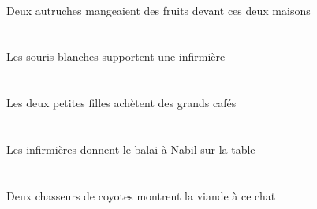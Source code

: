 \begin{exe}
\DEMDuOblG{}   \maisonDDuOblG{}   \DEVANTG{}   \INDDuErgG{}   \autrucheDDuErgG{}   \INDPlAbsG{}   \fruitBPlAbsG{}  \mangerVtPstBPlG{}\\
Deux autruches mangeaient des fruits devant ces deux maisons
\ex\glll
\DEFPlErg{}   \blancAPl{}   \sourisAPlErg{}   \INDSgAbs{}   \infirmiereBSgAbs{}  \supporterVtPrsBSg{}\\
\DEFPlErgP{}   \blancAPlP{}   \sourisAPlErgP{}   \INDSgAbsP{}   \infirmiereBSgAbsP{}  \supporterVtPrsBSgP{}\\
\DEFPlErgG{}   \blancAPlG{}   \sourisAPlErgG{}   \INDSgAbsG{}   \infirmiereBSgAbsG{}  \supporterVtPrsBSgG{}\\
Les souris blanches supportent une infirmière
\ex\glll
\DEFDuErg{}   \petitCDu{}   \filleCDuErg{}   \INDPlAbs{}   \grandDPl{}   \cafeDPlAbs{}  \acheterVtPrsDPl{}\\
\DEFDuErgP{}   \petitCDuP{}   \filleCDuErgP{}   \INDPlAbsP{}   \grandDPlP{}   \cafeDPlAbsP{}  \acheterVtPrsDPlP{}\\
\DEFDuErgG{}   \petitCDuG{}   \filleCDuErgG{}   \INDPlAbsG{}   \grandDPlG{}   \cafeDPlAbsG{}  \acheterVtPrsDPlG{}\\
Les deux petites filles achètent des grands cafés
\ex\glll
\DEFSgObl{}   \tableCSgObl{}   \SUR{}   \DEFPlErg{}   \infirmiereBPlErg{}    \INDSgDat{}   \NabilBSgDat{}   \DEFSgAbs{}   \balaiCSgAbs{}  \donnerVdPrsCSg{}\\
\DEFSgOblP{}   \tableCSgOblP{}   \SURP{}   \DEFPlErgP{}   \infirmiereBPlErgP{}    \INDSgDatP{}   \NabilBSgDatP{}   \DEFSgAbsP{}   \balaiCSgAbsP{}  \donnerVdPrsCSgP{}\\
\DEFSgOblG{}   \tableCSgOblG{}   \SURG{}   \DEFPlErgG{}   \infirmiereBPlErgG{}    \INDSgDatG{}   \NabilBSgDatG{}   \DEFSgAbsG{}   \balaiCSgAbsG{}  \donnerVdPrsCSgG{}\\
Les infirmières donnent le balai à Nabil sur la table
\ex\glll
\INDDuErg{}    \INDPlObl{}   \coyoteAPlObl{}   \DE{}   \chasseurCDuErg{}    \DEMSgDat{}   \chatDSgDat{}   \DEFSgAbs{}   \viandeASgAbs{}  \montrerVdPrsASg{}\\
\INDDuErgP{}    \INDPlOblP{}   \coyoteAPlOblP{}   \DEP{}   \chasseurCDuErgP{}    \DEMSgDatP{}   \chatDSgDatP{}   \DEFSgAbsP{}   \viandeASgAbsP{}  \montrerVdPrsASgP{}\\
\INDDuErgG{}    \INDPlOblG{}   \coyoteAPlOblG{}   \DEG{}   \chasseurCDuErgG{}    \DEMSgDatG{}   \chatDSgDatG{}   \DEFSgAbsG{}   \viandeASgAbsG{}  \montrerVdPrsASgG{}\\
Deux chasseurs de coyotes montrent la viande à ce chat

\end{exe}
